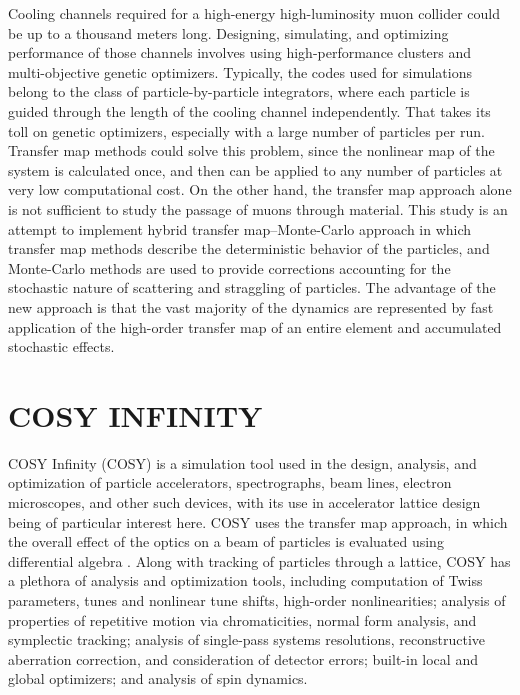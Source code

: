 \documentclass[a4paper,11pt]{article}
\begin{document}
Cooling channels required for a high-energy high-luminosity muon collider could be up to a thousand meters long. Designing, simulating, and optimizing performance of those channels involves using high-performance clusters and multi-objective genetic optimizers. Typically, the codes used for simulations belong to the class of particle-by-particle integrators, where each particle is guided through the length of the cooling channel independently. That takes its toll on genetic optimizers, especially with a large number of particles per run. Transfer map methods could solve this problem, since the nonlinear map of the system is calculated once, and then can be applied to any number of particles at very low computational cost. On the other hand, the transfer map approach alone is not sufficient to study the passage of muons through material. This study is an attempt to implement hybrid transfer map--Monte-Carlo approach in which transfer map methods describe the deterministic behavior of the particles, and Monte-Carlo methods are used to provide corrections accounting for the stochastic nature of scattering and straggling of particles. The advantage of the new approach is that the vast majority of the dynamics are represented by fast application of the high-order transfer map of an entire element and accumulated stochastic effects.

\section{COSY INFINITY}

COSY Infinity (COSY) \cite{COSY} is a simulation tool used in the design, analysis, and optimization of particle accelerators, spectrographs, beam lines, electron microscopes, and other such devices, with its use in accelerator lattice design being of particular interest here. COSY uses the transfer map approach, in which the overall effect of the optics on a beam of particles is evaluated using differential algebra \cite{berzMMM}. Along with tracking of particles through a lattice, COSY has a plethora of analysis and optimization tools, including computation of Twiss parameters, tunes and nonlinear tune shifts, high-order nonlinearities; analysis of properties of repetitive motion via chromaticities, normal form analysis, and symplectic tracking; analysis of single-pass systems resolutions, reconstructive aberration correction, and consideration of detector errors; built-in local and global optimizers; and analysis of spin dynamics.
\end{document}
